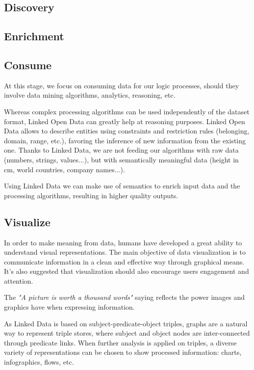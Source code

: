 \subsection{Discovery}
\label{subsec:discovery}

\subsection{Enrichment}

\subsection{Consume}


At this stage, we focus on consuming data for our logic processes, should they involve data mining algorithms, analytics, reasoning, etc.

Whereas complex processing algorithms can be used independently of the dataset format, Linked Open Data can greatly help at reasoning purposes. Linked Open Data allows to describe entities using constraints and restriction rules (belonging, domain, range, etc.), favoring the inference of new information from the existing one. Thanks to Linked Data, we are not feeding our algorithms with raw data (numbers, strings, values...), but with semantically meaningful data (height in cm, world countries, company names...).

Using Linked Data we can make use of semantics to enrich input data and the processing algorithms, resulting in higher quality outputs.

\subsection{Visualize}

In order to make meaning from data, humans have developed a great ability to understand visual representations. The main objective of data visualization is to communicate information in a clean and effective way through graphical means. It's also suggested that visualization should also encourage users engagement and attention.

The \textit{"A picture is worth a thousand words"} saying reflects the power images and graphics have when expressing information.

As Linked Data is based on subject-predicate-object triples, graphs are a natural way to represent triple stores, where subject and object nodes are inter-connected through predicate links. When further analysis is applied on triples, a diverse variety of representations can be chosen to show processed information: charts, infographics, flows, etc.
